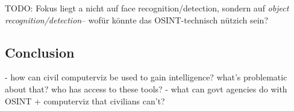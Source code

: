 \documentclass[twoside,a4paper]{article}
\begin{document}
TODO: Fokus liegt a nicht auf face recognition/detection, sondern auf \emph{object recognition/detection}-- wofür könnte das OSINT-technisch nützich sein?


\subsection{Conclusion}
\label{subsec:conclusion}
- how can civil computerviz be used to gain intelligence? what's problematic about that? who has access to these tools?
- what can govt agencies do with OSINT + computerviz that civilians can't?


\newpage
\printglossary

\nocite{*}

\end{document}
